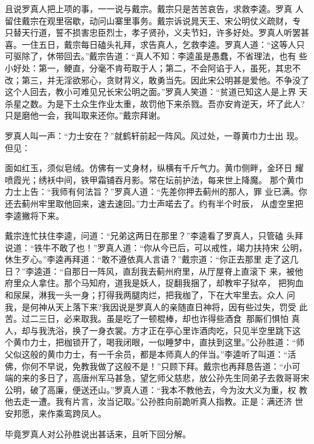 且说罗真人把上项的事，一一说与戴宗。戴宗只是苦苦哀告，求救李逵。罗真
人留住戴宗在观里宿歇，动问山寨里事务。戴宗诉说晁天王、宋公明仗义疏财，专
只替天行道，誓不损害忠臣烈士，孝子贤孙，义夫节妇，许多好处。罗真人听罢甚
喜。一住五日，戴宗每日磕头礼拜，求告真人，乞救李逵。罗真人道：“这等人只
可驱除了，休带回去。”戴宗告道：“真人不知：李逵虽是愚蠢，不省理法，也有
些小好处：第一，鲠直，分毫不肯苟取于人；第二，不会阿谄于人，虽死，其忠不
改；第三，并无淫欲邪心，贪财背义，敢勇当先。因此宋公明甚是爱他。不争没了
这个人回去，教小可难见兄长宋公明之面。”罗真人笑道：“贫道已知这人是上界
天杀星之数。为是下土众生作业太重，故罚他下来杀戮。吾亦安肯逆天，坏了此人?
只是磨他一会，我叫取来还你。”戴宗拜谢。

罗真人叫一声：“力士安在？”就鹤轩前起一阵风。风过处，一尊黄巾力士出
现。但见：

面如红玉，须似皂绒。仿佛有一丈身材，纵横有千斤气力。黄巾侧畔，金环日
耀喷霞光；绣袄中间，铁甲霜铺吞月影。常在坛前护法，每来世上降魔。
那个黄巾力士上告：“我师有何法旨？”罗真人道：“先差你押去蓟州的那人，罪
业已满。你还去蓟州牢里取他回来，速去速回。”力士声喏去了。约有半个时辰，
从虚空里把李逵撇将下来。

戴宗连忙扶住李逵，问道：“兄弟这两日在那里？”李逵看了罗真人，只管磕
头拜说道：“铁牛不敢了也！”罗真人道：“你从今已后，可以戒性，竭力扶持宋
公明，休生歹心。”李逵再拜道：“敢不遵依真人言语？”戴宗道：“你正去那里
走了这几日？”李逵道：“自那日一阵风，直刮我去蓟州府里，从厅屋脊上直滚下
来，被他府里众人拿住。那个马知府，道我是妖人，捉翻我捆了，却教牢子狱卒，
把狗血和尿屎，淋我一头一身；打得我两腿肉烂，把我枷了，下在大牢里去。众人
问我，是何神从天上落下来?我因说是罗真人的亲随直日神将，因有些过失，罚受
此苦。过二三日，必来取我。虽是吃了一顿棍棒，却也诈得些酒食，那厮们惧怕
真人，却与我洗浴，换了一身衣裳。方才正在亭心里诈酒肉吃，只见半空里跳下这
个黄巾力士，把枷锁开了，喝我闭眼，一似睡梦中，直扶到这里。”公孙胜道：“师
父似这般的黄巾力士，有一千余员，都是本师真人的伴当。”李逵听了叫道：“活
佛，你何不早说，免教我做了这般不是！”只顾下拜。戴宗也再拜恳告道：“小可
端的来的多日了，高唐州军马甚急，望乞师父慈悲，放公孙先生同弟子去救哥哥宋
公明，破了高廉，便送还山。”罗真人道：“我本不教他去，今为汝大义为重，权
教他去走一遭。我有片言，汝当记取。”公孙胜向前跪听真人指教。正是：满还济
世安邦愿，来作乘鸾跨凤人。

毕竟罗真人对公孙胜说出甚话来，且听下回分解。